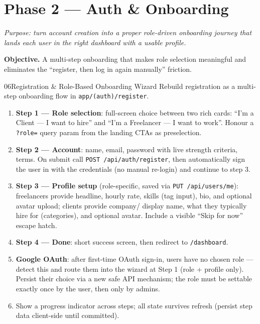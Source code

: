 \documentclass[11pt,a4paper]{article}
\newcommand{\objective}[1]{\noindent\textbf{Objective.} #1\medskip}
\begin{document}
\section{Phase 2 --- Auth \& Onboarding}

\textit{Purpose: turn account creation into a proper role-driven onboarding
journey that lands each user in the right dashboard with a usable profile.}

\objective{A multi-step onboarding that makes role selection meaningful and
eliminates the ``register, then log in again manually'' friction.}

\begin{promptbox}{06}{Registration \& Role-Based Onboarding Wizard}
Rebuild registration as a multi-step onboarding flow in \texttt{app/(auth)/register}.

\begin{enumerate}[leftmargin=1.6em]
  \item \textbf{Step 1 --- Role selection}: full-screen choice between two rich cards:
        ``I'm a Client --- I want to hire'' and ``I'm a Freelancer --- I want to
        work''. Honour a \texttt{?role=} query param from the landing CTAs as
        preselection.
  \item \textbf{Step 2 --- Account}: name, email, password with live strength
        criteria, terms. On submit call \texttt{POST /api/auth/register}, then
        automatically sign the user in with the credentials (no manual re-login) and
        continue to step 3.
  \item \textbf{Step 3 --- Profile setup} (role-specific, saved via
        \texttt{PUT /api/users/me}): freelancers provide headline, hourly rate,
        skills (tag input), bio, and optional avatar upload; clients provide company/
        display name, what they typically hire for (categories), and optional avatar.
        Include a visible ``Skip for now'' escape hatch.
  \item \textbf{Step 4 --- Done}: short success screen, then redirect to
        \texttt{/dashboard}.
  \item \textbf{Google OAuth}: after first-time OAuth sign-in, users have no chosen
        role --- detect this and route them into the wizard at Step 1 (role +
        profile only). Persist their choice via a new safe API mechanism; the role
        must be settable exactly once by the user, then only by admins.
  \item Show a progress indicator across steps; all state survives refresh (persist
        step data client-side until committed).
\end{enumerate}


\end{promptbox}
\end{document}
